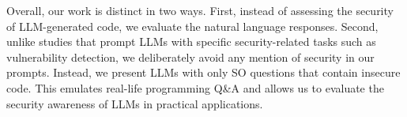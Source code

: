 
Overall, our work is distinct in two ways. First, instead of assessing the security of LLM-generated code, we evaluate the natural language responses. Second, unlike studies that prompt LLMs with specific security-related tasks such as vulnerability detection, we deliberately avoid any mention of security in our prompts. Instead, we present LLMs with only SO questions that contain insecure code. This emulates real-life programming Q\&A and allows us to evaluate the security awareness of LLMs in practical applications. %
